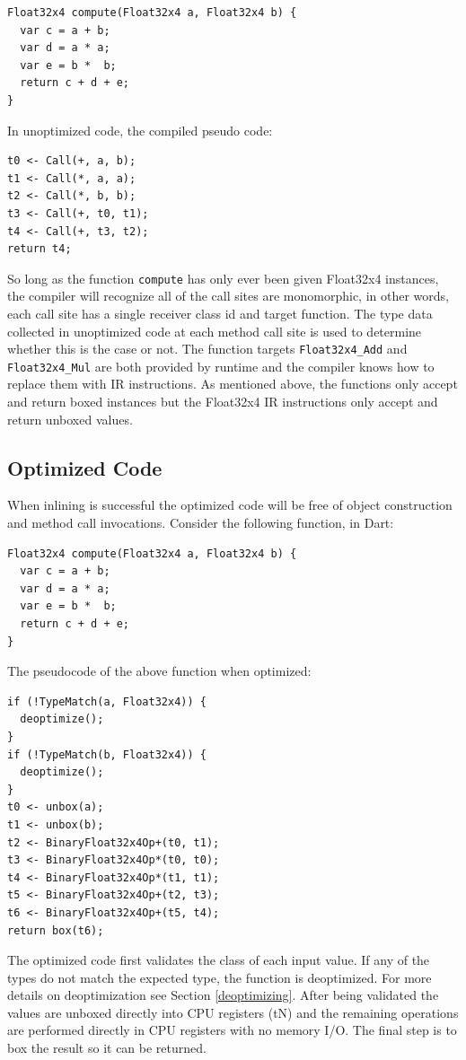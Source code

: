 \documentclass[preprint]{sigplanconf}
\begin{document}
\begin{verbatim}
Float32x4 compute(Float32x4 a, Float32x4 b) {
  var c = a + b;
  var d = a * a;
  var e = b *  b;
  return c + d + e;
}
\end{verbatim}

In unoptimized code, the compiled pseudo code:

\begin{verbatim}
t0 <- Call(+, a, b);
t1 <- Call(*, a, a);
t2 <- Call(*, b, b);
t3 <- Call(+, t0, t1);
t4 <- Call(+, t3, t2);
return t4;
\end{verbatim}

So long as the function \verb!compute! has only ever been given Float32x4 instances, the compiler will recognize all of the call sites are monomorphic, in other words, each call site has a single receiver class id and target function. The type data collected in unoptimized code at each method call site is used to determine whether this is the case or not. The function targets \verb!Float32x4_Add! and \verb!Float32x4_Mul! are both provided by runtime and the compiler knows how to replace them with IR instructions. As mentioned above, the functions only accept and return boxed instances but the Float32x4 IR instructions only accept and return unboxed values. 

\subsection{Optimized Code}
When inlining is successful the optimized code will be free of object construction and method call invocations. Consider the following function, in Dart:

\begin{verbatim}
Float32x4 compute(Float32x4 a, Float32x4 b) {
  var c = a + b;
  var d = a * a;
  var e = b *  b;
  return c + d + e;
}
\end{verbatim}

The pseudocode of the above function when optimized:

\begin{verbatim}
if (!TypeMatch(a, Float32x4)) {
  deoptimize();
}
if (!TypeMatch(b, Float32x4)) {
  deoptimize();
}
t0 <- unbox(a);
t1 <- unbox(b);
t2 <- BinaryFloat32x4Op+(t0, t1);
t3 <- BinaryFloat32x4Op*(t0, t0);
t4 <- BinaryFloat32x4Op*(t1, t1);
t5 <- BinaryFloat32x4Op+(t2, t3);
t6 <- BinaryFloat32x4Op+(t5, t4);
return box(t6);
\end{verbatim}

The optimized code first validates the class of each input value. If any of the types do not match the expected type, the function is deoptimized. For more details on deoptimization see Section \ref{deoptimizing}. After being validated the values are unboxed directly into CPU registers (tN) and the remaining operations are performed directly in CPU registers with no memory I/O. The final step is to box the result so it can be returned.
\end{document}
